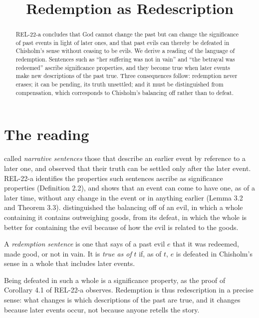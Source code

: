 \documentclass{situationist-preprint}
\title{Redemption as Redescription}
\begin{document}
\maketitle

\begin{abstract}
REL-22-a concludes that God cannot change the past but can change the significance of past events in light of later ones, and that past evils can thereby be defeated in Chisholm's sense without ceasing to be evils. We derive a reading of the language of redemption. Sentences such as \enquote{her suffering was not in vain} and \enquote{the betrayal was redeemed} ascribe significance properties, and they become true when later events make new descriptions of the past true. Three consequences follow: redemption never erases; it can be pending, its truth unsettled; and it must be distinguished from compensation, which corresponds to Chisholm's balancing off rather than to defeat.
\end{abstract}

\section{The reading}

\citet{Danto1965} called \emph{narrative sentences} those that describe an earlier event by reference to a later one, and observed that their truth can be settled only after the later event. REL-22-a identifies the properties such sentences ascribe as significance properties (Definition 2.2), and shows that an event can come to have one, as of a later time, without any change in the event or in anything earlier (Lemma 3.2 and Theorem 3.3). \citet{Chisholm1968} distinguished the balancing off of an evil, in which a whole containing it contains outweighing goods, from its defeat, in which the whole is better for containing the evil because of how the evil is related to the goods.

\begin{definition}\label{d:red}
A \emph{redemption sentence} is one that says of a past evil $e$ that it was redeemed, made good, or not in vain. It is \emph{true as of} $t$ if, as of $t$, $e$ is defeated in Chisholm's sense in a whole that includes later events.
\end{definition}

Being defeated in such a whole is a significance property, as the proof of Corollary 4.1 of REL-22-a observes. Redemption is thus redescription in a precise sense: what changes is which descriptions of the past are true, and it changes because later events occur, not because anyone retells the story.
\end{document}
